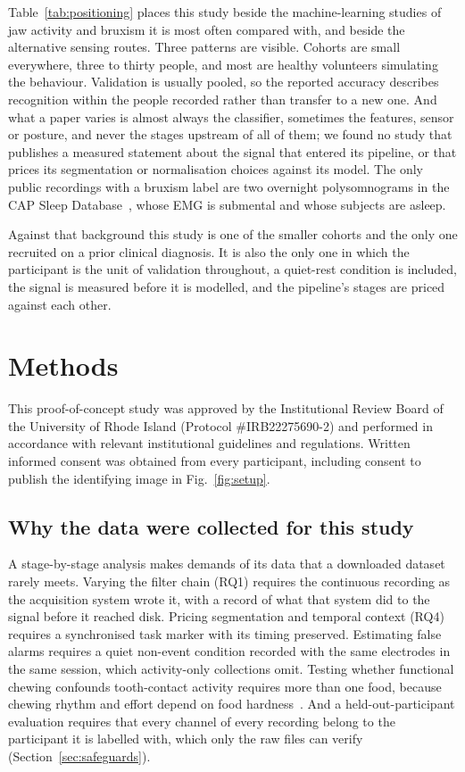 \documentclass[pdflatex,sn-nature,iicol]{sn-jnl}
\begin{document}
Table~\ref{tab:positioning} places this study beside the machine-learning studies of jaw activity and bruxism it is most often compared with, and beside the alternative sensing routes. Three patterns are visible. Cohorts are small everywhere, three to thirty people, and most are healthy volunteers simulating the behaviour. Validation is usually pooled, so the reported accuracy describes recognition within the people recorded rather than transfer to a new one. And what a paper varies is almost always the classifier, sometimes the features, sensor or posture, and never the stages upstream of all of them; we found no study that publishes a measured statement about the signal that entered its pipeline, or that prices its segmentation or normalisation choices against its model. The only public recordings with a bruxism label are two overnight polysomnograms in the CAP Sleep Database~\cite{terzano2001atlas,goldberger2000physiobank}, whose EMG is submental and whose subjects are asleep.

Against that background this study is one of the smaller cohorts and the only one recruited on a prior clinical diagnosis. It is also the only one in which the participant is the unit of validation throughout, a quiet-rest condition is included, the signal is measured before it is modelled, and the pipeline's stages are priced against each other.



\section{Methods}

This proof-of-concept study was approved by the Institutional Review Board of the University of Rhode Island (Protocol \#IRB22275690-2) and performed in accordance with relevant institutional guidelines and regulations. Written informed consent was obtained from every participant, including consent to publish the identifying image in Fig.~\ref{fig:setup}.

\subsection{Why the data were collected for this study}
\label{sec:why_data}

A stage-by-stage analysis makes demands of its data that a downloaded dataset rarely meets. Varying the filter chain (RQ1) requires the continuous recording as the acquisition system wrote it, with a record of what that system did to the signal before it reached disk. Pricing segmentation and temporal context (RQ4) requires a synchronised task marker with its timing preserved. Estimating false alarms requires a quiet non-event condition recorded with the same electrodes in the same session, which activity-only collections omit. Testing whether functional chewing confounds tooth-contact activity requires more than one food, because chewing rhythm and effort depend on food hardness~\cite{zhang2018monitoring}. And a held-out-participant evaluation requires that every channel of every recording belong to the participant it is labelled with, which only the raw files can verify (Section~\ref{sec:safeguards}).
\end{document}
